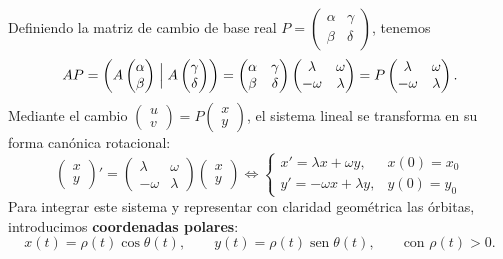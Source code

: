 Definiendo la matriz de cambio de base real $P = \begin{pmatrix} \alpha & \gamma \\ \beta & \delta \end{pmatrix}$, tenemos
\[
    A P = \left( A \begin{pmatrix} \alpha \\ \beta \end{pmatrix} \Bigm| A \begin{pmatrix} \gamma \\ \delta \end{pmatrix} \right)
    = \begin{pmatrix} \alpha & \gamma \\ \beta & \delta \end{pmatrix} \begin{pmatrix} \lambda & \omega \\ -\omega & \lambda \end{pmatrix}
    = P \begin{pmatrix} \lambda & \omega \\ -\omega & \lambda \end{pmatrix}.
\]
Mediante el cambio $\begin{pmatrix} u \\ v \end{pmatrix} = P \begin{pmatrix} x \\ y \end{pmatrix}$, el sistema lineal se transforma en su forma canónica rotacional:
\[
    \begin{pmatrix} x \\ y \end{pmatrix}' = \begin{pmatrix} \lambda & \omega \\ -\omega & \lambda \end{pmatrix} \begin{pmatrix} x \\ y \end{pmatrix}
    \iff
    \begin{cases}
        x' = \lambda x + \omega y, & x(0) = x_0 \\
        y' = -\omega x + \lambda y, & y(0) = y_0
    \end{cases}
\]
Para integrar este sistema y representar con claridad geométrica las órbitas, introducimos \textbf{coordenadas polares}:
\[
    x(t) = \rho(t) \cos \theta(t), \qquad y(t) = \rho(t) \operatorname{sen} \theta(t), \qquad \text{con } \rho(t) > 0.
\]
